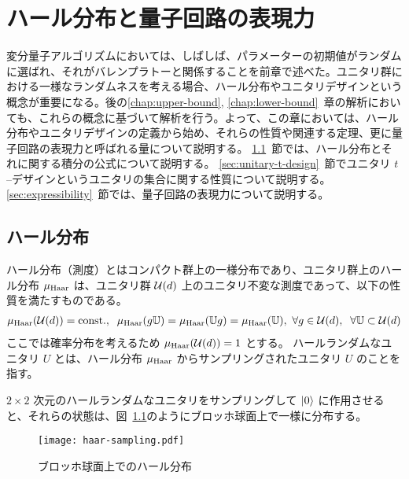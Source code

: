 \chapter{ハール分布と量子回路の表現力}\label{chap:haar}
変分量子アルゴリズムにおいては、しばしば、パラメーターの初期値がランダムに選ばれ、それがバレンプラトーと関係することを前章で述べた。ユニタリ群における一様なランダムネスを考える場合、ハール分布やユニタリデザインという概念が重要になる。後の\ref{chap:upper-bound}, \ref{chap:lower-bound}~章の解析においても、これらの概念に基づいて解析を行う。よって、この章においては、ハール分布やユニタリデザインの定義から始め、それらの性質や関連する定理、更に量子回路の表現力と呼ばれる量について説明する。
\ref{sec:haar-random}~節では、ハール分布とそれに関する積分の公式について説明する。
\ref{sec:unitary-t-design}~節でユニタリ $t$--デザインというユニタリの集合に関する性質について説明する。
\ref{sec:expressibility}~節では、量子回路の表現力について説明する。

\section{ハール分布}\label{sec:haar-random}
ハール分布（測度）とはコンパクト群上の一様分布であり、ユニタリ群上のハール分布 $\mu_{\mathrm{Haar}}$ は、ユニタリ群 $\mathcal{U}(d)$ 上のユニタリ不変な測度であって、以下の性質を満たすものである。
\begin{align}
    \mu_{\mathrm{Haar}}(\mathcal{U}(d)) = \mathrm{const.},\;\;
    \mu_{\mathrm{Haar}}(g\mathbb{U}) = \mu_{\mathrm{Haar}}(\mathbb{U} g) = \mu_{\mathrm{Haar}}(\mathbb{U}),\,\,\forall g\in \mathcal{U}(d),\;\;
    \forall \mathbb{U}\subset \mathcal{U}(d)
\end{align}
ここでは確率分布を考えるため $\mu_{\mathrm{Haar}}(\mathcal{U}(d)) = 1$ とする。
ハールランダムなユニタリ $U$ とは、ハール分布 $\mu_{\mathrm{Haar}}$ からサンプリングされたユニタリ $U$ のことを指す。

$2\times 2$ 次元のハールランダムなユニタリをサンプリングして $\ket{0}$ に作用させると、それらの状態は、図~\ref{fig:haar-1qubit}のようにブロッホ球面上で一様に分布する。
\begin{figure}[H]
    \centering
    \texttt{[image: haar-sampling.pdf]}
    \caption{ブロッホ球面上でのハール分布}
    \label{fig:haar-1qubit}
\end{figure}


